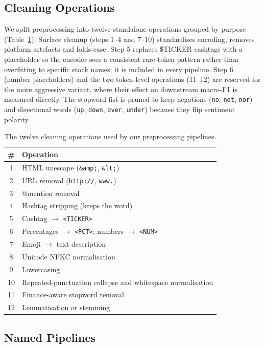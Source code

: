 \documentclass[12pt,a4paper]{article}
\begin{document}
\subsection{Cleaning Operations}

We split preprocessing into twelve standalone operations grouped by purpose (Table~\ref{tab:steps}). Surface cleanup (steps 1--4 and 7--10) standardises encoding, removes platform artefacts and folds case. Step 5 replaces \$TICKER cashtags with a placeholder so the encoder sees a consistent rare-token pattern rather than overfitting to specific stock names; it is included in every pipeline. Step 6 (number placeholders) and the two token-level operations (11--12) are reserved for the more aggressive variant, where their effect on downstream macro-F1 is measured directly. The stopword list is pruned to keep negations (\texttt{no}, \texttt{not}, \texttt{nor}) and directional words (\texttt{up}, \texttt{down}, \texttt{over}, \texttt{under}) because they flip sentiment polarity.

\begin{table}[!htbp]
\centering
\small
\begin{tabular}{cl}
\toprule
\textbf{\#} & \textbf{Operation} \\
\midrule
1  & HTML unescape (\texttt{\&amp;}, \texttt{\&lt;}) \\
2  & URL removal (\texttt{http://}, \texttt{www.}) \\
3  & @mention removal \\
4  & Hashtag stripping (keeps the word) \\
5  & Cashtag $\rightarrow$ \texttt{<TICKER>} \\
6  & Percentages $\rightarrow$ \texttt{<PCT>}; numbers $\rightarrow$ \texttt{<NUM>} \\
7  & Emoji $\rightarrow$ text description \\
8  & Unicode NFKC normalisation \\
9  & Lowercasing \\
10 & Repeated-punctuation collapse and whitespace normalisation \\
11 & Finance-aware stopword removal \\
12 & Lemmatisation or stemming \\
\bottomrule
\end{tabular}
\caption{The twelve cleaning operations used by our preprocessing pipelines.}
\label{tab:steps}
\end{table}

\subsection{Named Pipelines}
\end{document}
